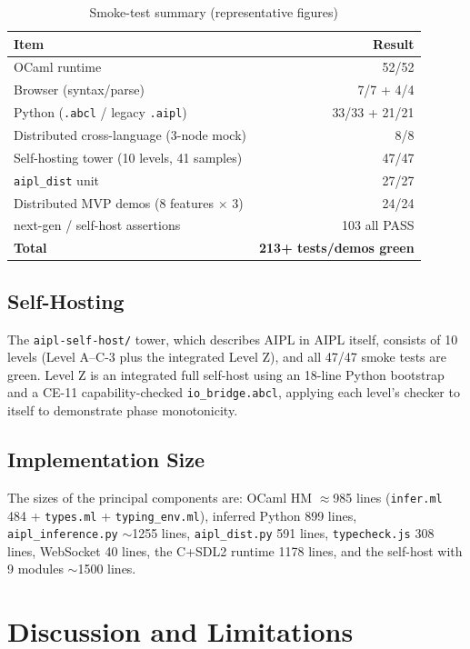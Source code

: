 \documentclass[11pt,a4paper]{article}
\newcommand{\code}[1]{\texttt{\small #1}}
\begin{document}
\begin{table}[h]
\centering\small
\caption{Smoke-test summary (representative figures)}\label{tab:smoke}
\begin{tabularx}{\linewidth}{@{}X r@{}}
\toprule
Item & Result \\
\midrule
OCaml runtime & 52/52 \\
Browser (syntax/parse) & 7/7 + 4/4 \\
Python (\code{.abcl} / legacy \code{.aipl}) & 33/33 + 21/21 \\
Distributed cross-language (3-node mock) & 8/8 \\
Self-hosting tower (10 levels, 41 samples) & 47/47 \\
\code{aipl\_dist} unit & 27/27 \\
Distributed MVP demos (8 features $\times$ 3) & 24/24 \\
next-gen / self-host assertions & 103 all PASS \\
\midrule
\textbf{Total} & \textbf{213+ tests/demos green} \\
\bottomrule
\end{tabularx}
\end{table}

\subsection{Self-Hosting}
The \code{aipl-self-host/} tower, which describes AIPL in AIPL itself,
consists of 10 levels (Level A--C-3 plus the integrated Level Z), and all
47/47 smoke tests are green. Level Z is an integrated full self-host
using an 18-line Python bootstrap and a CE-11 capability-checked
\code{io\_bridge.abcl}, applying each level's checker to itself to
demonstrate phase monotonicity.

\subsection{Implementation Size}
The sizes of the principal components are: OCaml HM $\approx$985 lines
(\code{infer.ml} 484 + \code{types.ml} + \code{typing\_env.ml}), inferred
Python 899 lines, \code{aipl\_inference.py} $\sim$1255 lines,
\code{aipl\_dist.py} 591 lines, \code{typecheck.js} 308 lines, WebSocket
40 lines, the C+SDL2 runtime 1178 lines, and the self-host with 9 modules
$\sim$1500 lines.

\section{Discussion and Limitations}\label{sec:discuss}
\end{document}
